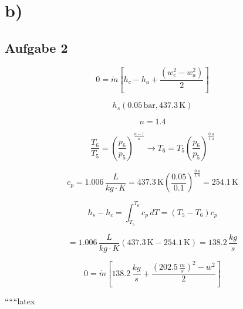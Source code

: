 

\section*{b)}

\subsection*{Aufgabe 2}

\[
0 = \dot{m} \left[ h_c - h_a + \frac{\left( w_c^2 - w_a^2 \right)}{2} \right]
\]

\[
h_s (0.05 \, \text{bar}, 437.3 \, \text{K})
\]

\[
n = 1.4
\]

\[
\frac{T_6}{T_5} = \left( \frac{p_6}{p_5} \right)^{\frac{n-1}{n}} \rightarrow T_6 = T_5 \left( \frac{p_6}{p_5} \right)^{\frac{0.4}{1.4}}
\]

\[
c_p = 1.006 \, \frac{L}{kg \cdot K} = 437.3 \, \text{K} \left( \frac{0.05}{0.1} \right)^{\frac{0.4}{1.4}} = 254.1 \, \text{K}
\]

\[
h_s - h_c = \int_{T_5}^{T_6} c_p \, dT = (T_5 - T_6) c_p
\]

\[
= 1.006 \, \frac{L}{kg \cdot K} (437.3 \, \text{K} - 254.1 \, \text{K}) = 138.2 \, \frac{kg}{s}
\]

\[
0 = \dot{m} \left[ 138.2 \, \frac{kg}{s} + \frac{\left( 202.5 \, \frac{m}{s} \right)^2 - w^2}{2} \right]
\]

``````latex
